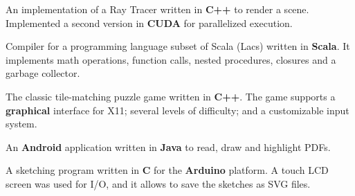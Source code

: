 \documentclass[]{deedy-resume-openfont}
\begin{document}
\begin{minipage}[t]{0.33\textwidth}
    An implementation of a Ray Tracer written in \textbf{C++} to render a scene. Implemented a second version in \textbf{CUDA} for parallelized execution.
\sectionsep

    Compiler for a programming language subset of Scala (Lacs) written in \textbf{Scala}. It implements math operations, function calls, nested procedures, closures and a garbage collector.
\sectionsep

The classic tile-matching puzzle game written in \textbf{C++}. The game supports a \textbf{graphical} interface for X11; several levels of difficulty; and a customizable input system.
\sectionsep

An \textbf{Android} application written in \textbf{Java} to read, draw and highlight PDFs.
\sectionsep

A sketching program written in \textbf{C} for the \textbf{Arduino} platform. A touch LCD screen was used for I/O, and it allows to save the sketches as SVG files.
\sectionsep

%
%

\end{minipage} 
\hfill
\end{document}
